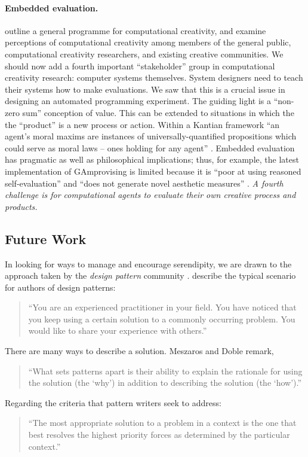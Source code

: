\paragraph{\textbf{Embedded evaluation}.}   outline a general programme
  for computational creativity, and examine perceptions of
  computational creativity among members of the general public,
  computational creativity researchers, and existing creative
  communities.  We should now add a fourth important ``stakeholder''
  group in computational creativity research: computer systems
  themselves.  System designers need to teach their systems how to
  make evaluations.  We saw that this is a crucial issue in designing
  an automated programming experiment.  The guiding light is a
  ``non-zero sum'' conception of value.  This can be extended to
  situations in which the the ``product'' is a new process or action.
  Within a Kantian framework ``an agent's moral maxims are instances
  of universally-quantified propositions which could serve as moral
  laws -- ones holding for any agent'' \cite{powers2005deontological}.
  Embedded evaluation has pragmatic as well as philosophical
  implications; thus, for example, the latest implementation of {\sf
    GAmprovising} is limited because it is ``poor at using reasoned
  self-evaluation'' and ``does not generate novel aesthetic measures''
  \cite[pp.~189, 288]{jordanous2012evaluating}.  \emph{A fourth
    challenge is for computational agents to evaluate their own
    creative process and products.}

\subsection{Future Work} \label{sec:futurework} \label{sec:hatching}

In looking for ways to manage and encourage serendipity, we are drawn
to the approach taken by the \emph{design pattern} community
\cite{alexander1999origins}. 
 describe the typical scenario for authors of design patterns:

\begin{quote}
\noindent ``You are an experienced practitioner in your field.  You
have noticed that you keep using a certain solution to a commonly
occurring problem.  You would like to share your experience with
others.''
\end{quote}

\noindent There are many ways to describe a solution. Meszaros and Doble remark,
\begin{quote}
\noindent ``What sets patterns apart is their ability to explain the
rationale for using the solution (the `why') in addition to describing
the solution (the `how').''
\end{quote}
Regarding the criteria that pattern writers seek to address: 
\begin{quote}
\noindent ``The most appropriate solution to a problem in a context is
the one that best resolves the highest priority forces as determined
by the particular context.''
\end{quote}

